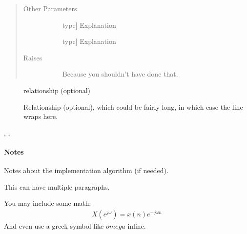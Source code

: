 \documentclass[letterpaper,10pt,english]{sphinxmanual}
\begin{document}
\begin{fulllineitems}
\begin{quote}
\begin{description}
\item[{Other Parameters}] \leavevmode\begin{description}
\item[{}] \leavevmode{[}type{]}
Explanation

\item[{}] \leavevmode{[}type{]}
Explanation

\end{description}

\item[{Raises}] \leavevmode\begin{description}
\item[{}] \leavevmode
Because you shouldn’t have done that.

\end{description}

\end{description}\end{quote}



\begin{description}
\item[{}] \leavevmode
relationship (optional)

\item[{}] \leavevmode
Relationship (optional), which could be fairly long, in which case the line wraps here.

\end{description}

, , 


\paragraph{Notes}

Notes about the implementation algorithm (if needed).

This can have multiple paragraphs.

You may include some math:
\begin{equation*}
\begin{split}X(e^{j\omega } ) = x(n)e^{ - j\omega n}\end{split}
\end{equation*}
And even use a greek symbol like \(omega\) inline.

\end{fulllineitems}
\end{document}
